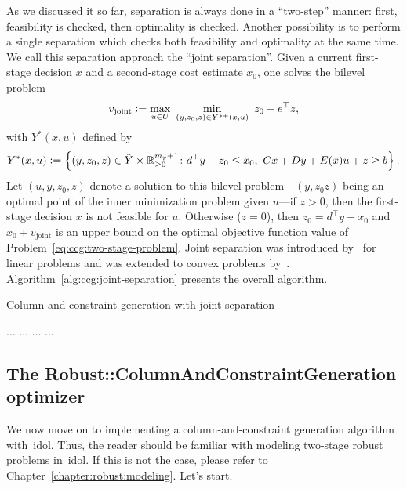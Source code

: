 As we discussed it so far, separation is always done in a ``two-step'' manner:
first, feasibility is checked, then optimality is checked. Another possibility
is to perform a single separation which checks both feasibility and optimality
at the same time. We call this separation approach the ``joint separation''.
Given a current first-stage decision $x$ and a second-stage cost estimate
$x_0$, one solves the bilevel problem 
\begin{equation*}
    v_\text{joint} \define \max_{u\in U} \ \min_{(y,z_0,z)\in Y^{*+}(x,u)} \ { z_0 + e^\top z },
\end{equation*}
with $Y^{*}(x,u)$ defined by
\begin{equation*}
    Y^{*}(x,u) \mathrel{{\mathop:}{=}} \left\{ (y,z_0,z)\in\tilde{Y}\times\mathbb{R}^{m_y+1}_{\ge 0} \colon d^\top y - z_0 \le x_0, \ Cx + Dy + E(x)u + z \ge b\right\}.
\end{equation*}
Let $(u,y,z_0,z)$ denote a solution to this bilevel problem---$(y,z_0z)$ being
an optimal point of the inner minimization problem given $u$---if $z > 0$,
then the first-stage decision $x$ is not feasible for $u$. Otherwise ($z=0$),
then $z_0 = d^\top y - x_0$ and $x_0 + v_\text{joint}$ is an upper bound on
the optimal objective function value of
Problem~\eqref{eq:ccg:two-stage-problem}. Joint separation was introduced
by~\textcite{Ayoub2016} for linear problems and was extended to convex
problems by~\textcite{lefebvre2022convex}.
Algorithm~\ref{alg:ccg:joint-separation} presents the overall algorithm.

\begin{algorithm}
    \caption{Column-and-constraint generation with joint separation}
    \label{alg:ccg:joint-separation}
    \begin{algorithmic}[1]
        \State ...
        \While {}
        \State ...
            \State ... 
        \EndIf
        \State ...
        \EndWhile
    \end{algorithmic}
\end{algorithm}

\subsection{The \textsf{Robust::ColumnAndConstraintGeneration} optimizer}

We now move on to implementing a column-and-constraint generation algorithm
with~\textsf{idol}. Thus, the reader should be familiar with modeling
two-stage robust problems in~\textsf{idol}. If this is not the case, please
refer to Chapter~\ref{chapter:robust:modeling}. Let's start. 

